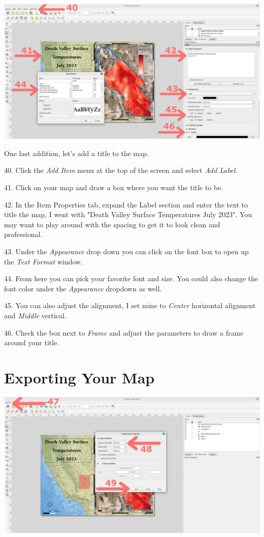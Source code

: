 \documentclass[oneside,a4paper,11pt,explicit]{book}
\begin{document}
\centerline{\includegraphics[width=\textwidth]{TextBox.png}}

One last addition, let's add a title to the map. 

40. Click the \textit{Add Item} menu at the top of the screen and select \textit{Add Label}.

41. Click on your map and draw a box where you want the title to be. 

42. In the Item Properties tab, expand the Label section and enter the text to title the map, I went with "Death Valley Surface Temperatures July 2023". You may want to play around with the spacing to get it to look clean and professional.

43. Under the \textit{Appearance} drop down you can click on the font box to open up the \textit{Text Format} window. 

44. From here you can pick your favorite font and size. You could also change the font color under the \textit{Appearance} dropdown as well.

45.  You can also adjust the alignment, I set mine to \textit{Center} horizontal alignment and \textit{Middle} vertical.

46. Check the box next to \textit{Frame} and adjust the parameters to draw a frame around your title.

\section{Exporting Your Map}

\centerline{\includegraphics[width=\textwidth]{Export.png}}
\end{document}
